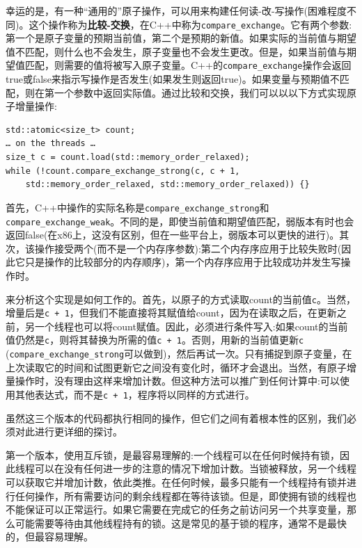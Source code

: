 幸运的是，有一种“通用的”原子操作，可以用来构建任何读-改-写操作(困难程度不同)。这个操作称为\textbf{比较-交换}，在C++中称为\texttt{compare\_exchange}。它有两个参数:第一个是原子变量的预期当前值，第二个是预期的新值。如果实际的当前值与期望值不匹配，则什么也不会发生，原子变量也不会发生更改。但是，如果当前值与期望值匹配，则需要的值将被写入原子变量。C++的\texttt{compare\_exchange}操作会返回true或false来指示写操作是否发生(如果发生则返回true)。如果变量与预期值不匹配，则在第一个参数中返回实际值。通过比较和交换，我们可以以以下方式实现原子增量操作:

\begin{lstlisting}[style=styleCXX]
std::atomic<size_t> count;
… on the threads …
size_t c = count.load(std::memory_order_relaxed);
while (!count.compare_exchange_strong(c, c + 1,
	std::memory_order_relaxed, std::memory_order_relaxed)) {}
\end{lstlisting}

首先，C++中操作的实际名称是\texttt{compare\_exchange\_strong}和\texttt{compare\_exchange\_weak}。不同的是，即使当前值和期望值匹配，弱版本有时也会返回false(在x86上，这没有区别，但在一些平台上，弱版本可以更快的进行)。其次，该操作接受两个(而不是一个内存序参数):第二个内存序应用于比较失败时(因此它只是操作的比较部分的内存顺序)，第一个内存序应用于比较成功并发生写操作时。

来分析这个实现是如何工作的。首先，以原子的方式读取count的当前值\texttt{c}。当然，增量后是\texttt{c + 1}，但我们不能直接将其赋值给count，因为在读取之后，在更新之前，另一个线程也可以将count赋值。因此，必须进行条件写入:如果count的当前值仍然是\texttt{c}，则将其替换为所需的值\texttt{c + 1}。否则，用新的当前值更新\texttt{c} (\texttt{compare\_exchange\_strong}可以做到)，然后再试一次。只有捕捉到原子变量，在上次读取它的时间和试图更新它之间没有变化时，循环才会退出。当然，有原子增量操作时，没有理由这样来增加计数。但这种方法可以推广到任何计算中:可以使用其他表达式，而不是\texttt{c + 1}，程序将以同样的方式进行。

虽然这三个版本的代码都执行相同的操作，但它们之间有着根本性的区别，我们必须对此进行更详细的探讨。


第一个版本，使用互斥锁，是最容易理解的:一个线程可以在任何时候持有锁，因此线程可以在没有任何进一步的注意的情况下增加计数。当锁被释放，另一个线程可以获取它并增加计数，依此类推。在任何时候，最多只能有一个线程持有锁并进行任何操作，所有需要访问的剩余线程都在等待该锁。但是，即使拥有锁的线程也不能保证可以正常运行。如果它需要在完成它的任务之前访问另一个共享变量，那么可能需要等待由其他线程持有的锁。这是常见的基于锁的程序，通常不是最快的，但最容易理解。

